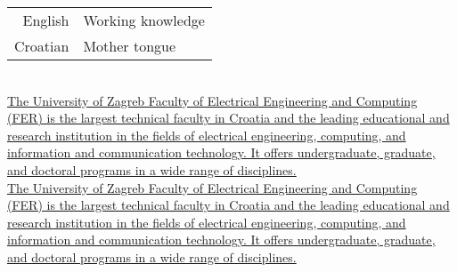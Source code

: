\documentclass[theme]{cv_style}
\begin{document}
\begin{paracol}{2}
\begin{leftcolumn*}
{\begin{minipage}[r]{\leftcolwidth}
                \begin{tabular}{r|l}
                    English & Working knowledge\\[0.3em]
                    Croatian & Mother tongue
                \end{tabular}
            \end{minipage}
            \vspace{\sectionspace}
        }
        \end{leftcolumn*}
        \begin{rightcolumn}\noindent \small
            \phantom{} \\ %
            \href{https://www.fer.unizg.hr/}{
            {The University of Zagreb Faculty of Electrical Engineering and Computing (FER) is the largest technical faculty in Croatia and the leading educational and research institution in the fields of electrical engineering, computing, and information and communication technology. It offers undergraduate, graduate, and doctoral programs in a wide range of disciplines.}}
            \vspace{\itemspace}\\
            \href{https://www.fer.unizg.hr/}{
            {The University of Zagreb Faculty of Electrical Engineering and Computing (FER) is the largest technical faculty in Croatia and the leading educational and research institution in the fields of electrical engineering, computing, and information and communication technology. It offers undergraduate, graduate, and doctoral programs in a wide range of disciplines.}}

\end{rightcolumn}
\end{paracol}
\end{document}
